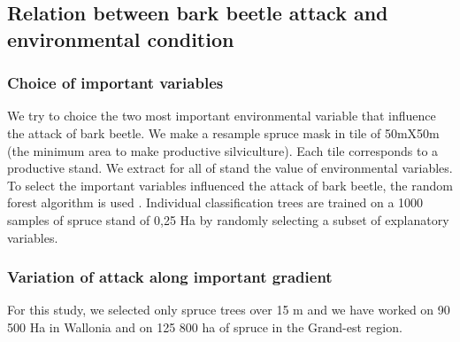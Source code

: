 \documentclass[3p,procedia]{elsarticle}
\begin{document}



\subsection{Relation between bark beetle attack and environmental condition}

\subsubsection{Choice of important variables}

We try to choice the two most important environmental variable that influence the attack of bark beetle.
We make a resample spruce mask in tile of 50mX50m (the minimum area to make productive silviculture). Each tile corresponds to a productive stand. 
We extract for all of stand the value of environmental variables.  
To select the important variables influenced the attack of bark beetle, the random forest algorithm is used \citep{genuer_vsurf_2015}.
Individual classification trees are trained on a 1000 samples of spruce stand of 0,25 Ha by randomly selecting a subset of explanatory variables.




\subsubsection{Variation of attack along important gradient}
For this study, we selected only spruce trees over 15 m and we have worked on 90 500 Ha in Wallonia and  on 125 800 ha of spruce in the Grand-est region.  
			

\end{document}
